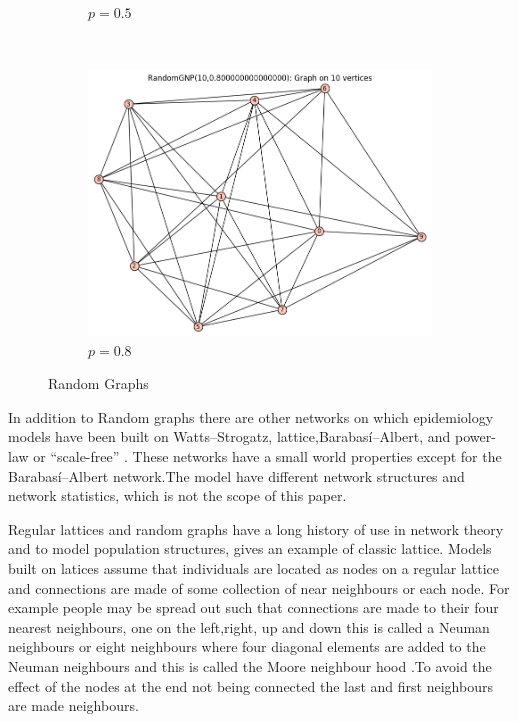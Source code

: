 \begin{figure}[h]
\begin{subfigure}[b]{0.3\textwidth}
        \caption{$p=0.5$}
        \label{fig:b}
    \end{subfigure}
    ~ %
    \begin{subfigure}[b]{0.3\textwidth}
        \includegraphics[width=\textwidth]{images/rgraph3}
        \caption{$p= 0.8$}
        \label{fig:c}
    \end{subfigure}
    \caption{Random Graphs}\label{fig:randomgraphs}
\end{figure}


In addition to Random graphs there are other networks on which epidemiology models have been built on   Watts–Strogatz, lattice,Barabasí–Albert, and power-law or “scale-free” \citep{witten2007simulations}. These networks have a small world properties except for the Barabasí–Albert network.The model have different network structures and network statistics, which is not the scope of this paper.


Regular lattices and random graphs have a long history of use in network theory and to model population structures,\cite{harris1974contact}  gives an example of classic lattice. Models built on latices assume that individuals are located as nodes on a regular lattice and connections are made of some collection of near neighbours or each node. For example people may be spread out such that connections are made to their four nearest neighbours, one on the left,right, up and down this is called a Neuman neighbours  or eight neighbours where four diagonal elements are added to the Neuman neighbours and this is called the Moore neighbour hood \citep{lloyd2006infection}.To avoid the effect of the nodes at the end not being connected the last and first neighbours are made neighbours.

